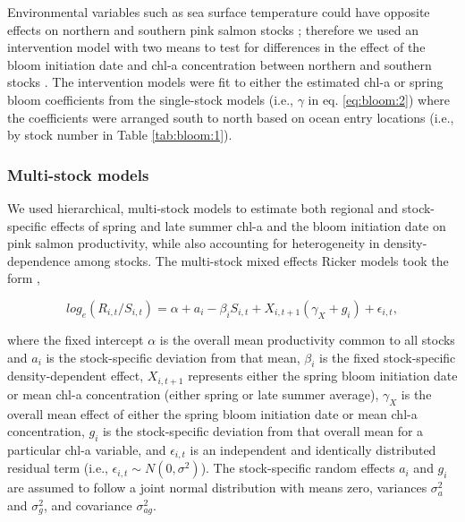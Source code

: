 Environmental variables such as sea surface temperature could have opposite
effects on northern and southern pink salmon stocks \citep{Mueter2002a,
Su2004a}; therefore we used an intervention model with two means
\citep{Chatfield2004, Mueter2002a} to test for differences in the effect of the
bloom initiation date and chl-a concentration between northern and southern
stocks \citep{Chatfield2004, Mueter2002a}. The intervention models were fit to
either the estimated chl-a or spring bloom coefficients from the single-stock
models (i.e., \(\gamma\) in eq. \ref{eq:bloom:2}) where the coefficients were
arranged south to north based on ocean entry locations (i.e., by stock number in
Table \ref{tab:bloom:1}).


\subsubsection{Multi-stock models}

We used hierarchical, multi-stock models to estimate both regional and
stock-specific effects of spring and late summer chl-a and the bloom initiation
date on pink salmon productivity, while also accounting for heterogeneity in
density-dependence among stocks. The multi-stock mixed effects Ricker models
took the form \citep{Myers1999a, Mueter2002a},

\begin{equation}
log_e(R_{i,t}/S_{i,t}) = \alpha + a_i - \beta_iS_{i,t} +
X_{i,t+1} (\gamma_{X} + g_{i}) + \epsilon_{i,t}, \label{eq:bloom:3}
\end{equation}

\noindent where the fixed intercept \(\alpha\) is the overall mean productivity
common to all stocks and \(a_i\) is the stock-specific deviation from that mean,
\(\beta_i\) is the fixed stock-specific density-dependent effect, \(X_{i,t+1}\)
represents either the spring bloom initiation date or mean chl-a concentration
(either spring or late summer average), \(\gamma_X\) is the overall mean effect
of either the spring bloom initiation date or mean chl-a concentration, \(g_i\)
is the stock-specific deviation from that overall mean for a particular chl-a
variable, and \(\epsilon_{i,t}\) is an independent and identically distributed
residual term (i.e., \(\epsilon_{i,t} \sim N(0,\sigma^2)\)).  The stock-specific
random effects \(a_i\) and \(g_i\) are assumed to follow a joint normal
distribution with means zero, variances \(\sigma^2_a\) and \(\sigma^2_g\), and
covariance \(\sigma^2_{ag}\).

